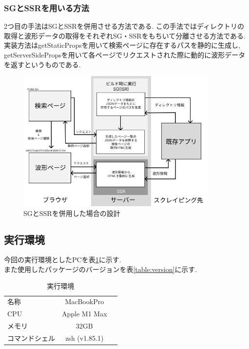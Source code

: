 \subsubsection{SGとSSRを用いる方法}
2つ目の手法はSGとSSRを併用させる方法である.
この手法ではディレクトリの取得と波形データの取得をそれぞれSG・SSRをもちいて分離させる方法である.
実装方法はgetStaticPropsを用いて検索ページに存在するパスを静的に生成し, getServerSidePropsを用いて各ページでリクエストされた際に動的に波形データを返すというものである.

\begin{figure}[htbp]
	\begin{center}
		\includegraphics[width=100mm]{./images/app/SG-SSRver.png}
		\caption{SGとSSRを併用した場合の設計}\label{fig:SG-SSR-arc}
	\end{center}
\end{figure}

\subsection{実行環境}
今回の実行環境としたPCを表\ref{table:zikkoukannkyo}に示す.\\
また使用したパッケージのバージョンを表\ref{table:version}に示す.

\begin{table}[hbtp]
	\caption{実行環境}
	\label{table:zikkoukannkyo}
	\centering
	\begin{tabular}{lcr}
		\hline
		名称      & MacBookPro    \\
		CPU     & Apple M1 Max  \\
		メモリ     & 32GB          \\
		コマンドシェル & zsh (v1.85.1) \\
		\hline
	\end{tabular}
\end{table}

